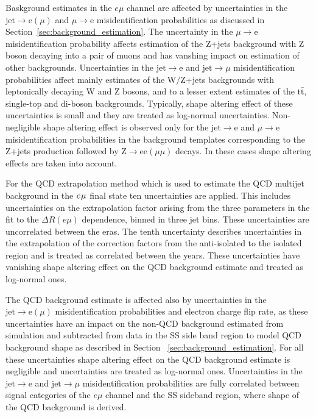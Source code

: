Baskground estimates in the $e\mu$ channel are affected by uncertainties in the $\mathrm{jet}\rightarrow \mathrm{e}(\mu)$ and $\mu \rightarrow \mathrm{e}$ misidentification probabilities as discussed in Section~\ref{sec:background_estimation}. The uncertainty in the $\mu \rightarrow \mathrm{e}$ misidentification probability affects estimation of the $\mathrm{Z}$+jets background with Z boson decaying into a pair of muons and has vanshing impact on estimation of other backgrounds. Uncertainties in the $\mathrm{jet}\rightarrow \mathrm{e}$ and $\mathrm{jet}\rightarrow \mu$ misidentification probabilities affect mainly estimates of the $\mathrm{W/Z}$+jets backgrounds with leptonically decaying W and Z bosons, and to a lesser extent estimates of the $\mathrm{t\bar{t}}$, single-top and di-boson backgrounds. Typically, shape altering effect of these uncertainties is small and they are treated as log-normal uncertainties. Non-negligible shape altering effect is observed only for the $\mathrm{jet}\rightarrow \mathrm{e}$ and $\mu \rightarrow \mathrm{e}$ misidentification probabilities in the background templates corresponding to the $\mathrm{Z}$+jets production followed by $\mathrm{Z}\rightarrow \mathrm{ee}(\mu\mu)$ decays. In these cases shape altering effects are taken into account. 

For the QCD extrapolation method which is used to estimate the QCD multijet background in the $e_{}\mu_{}$ final state ten uncertainties are applied.
This includes uncertainties on the extrapolation factor arising from the three parameters in the fit to the $\Delta R (e\mu)$ dependence, binned in three jet bins.
These uncertainties are uncorrelated between the eras.
The tenth uncertainty describes uncertainties in the extrapolation of the correction factors from the anti-isolated to the isolated region and is treated as correlated between the years. These uncertainties have vanishing shape altering effect on the QCD background estimate and treated as log-normal ones.

The QCD background estimate is affected also by uncertainties in the $\mathrm{jet}\rightarrow \mathrm{e}(\mu)$ misidentification probabilities and electron charge flip rate, as these uncertainties have an impact on the non-QCD background estimated from simulation and subtracted from data in the SS side band region to model QCD background shape as described in Section ~\ref{sec:background_estimation}. For all these uncertainties shape altering effect on the QCD background estimate is negligible and uncertainties are treated as log-normal ones.
Uncertainties in the $\mathrm{jet}\rightarrow \mathrm{e}$ and $\mathrm{jet}\rightarrow \mu$ misidentification probabilities are fully correlated between signal categories of the $e\mu$ channel and the SS sideband region, where shape of the QCD background is derived.

